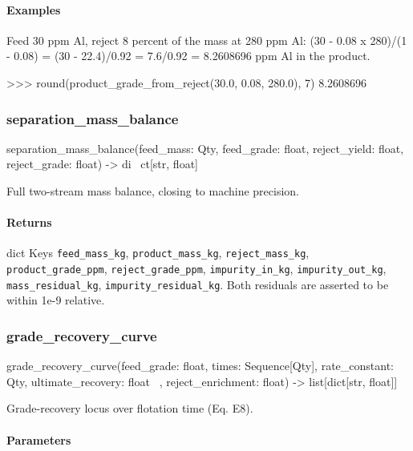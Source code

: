 \documentclass[10pt,a4paper,twoside]{report}
\begin{document}
\paragraph*{Examples}

Feed 30 ppm Al, reject 8 percent of the mass at 280 ppm Al: (30 - 0.08 x 280)/(1 - 0.08) = (30 - 22.4)/0.92 = 7.6/0.92 = 8.2608696 ppm Al in the product.

\begin{doctestblock}
>>> round(product_grade_from_reject(30.0, 0.08, 280.0), 7)
8.2608696
\end{doctestblock}

\subsubsection*{separation\_mass\_balance}

\begin{verbatimsmall}
separation_mass_balance(feed_mass: Qty, feed_grade: float, reject_yield: float, reject_grade: float) -> di
    \ ct[str, float]
\end{verbatimsmall}

Full two-stream mass balance, closing to machine precision.

\paragraph*{Returns}

dict Keys \texttt{feed\_mass\_kg}, \texttt{product\_mass\_kg}, \texttt{reject\_mass\_kg}, \texttt{product\_grade\_ppm}, \texttt{reject\_grade\_ppm}, \texttt{impurity\_in\_kg}, \texttt{impurity\_out\_kg}, \texttt{mass\_residual\_kg}, \texttt{impurity\_residual\_kg}. Both residuals are asserted to be within 1e-9 relative.

\subsubsection*{grade\_recovery\_curve}

\begin{verbatimsmall}
grade_recovery_curve(feed_grade: float, times: Sequence[Qty], rate_constant: Qty, ultimate_recovery: float
    \ , reject_enrichment: float) -> list[dict[str, float]]
\end{verbatimsmall}

Grade-recovery locus over flotation time (Eq. E8).

\paragraph*{Parameters}
\end{document}
